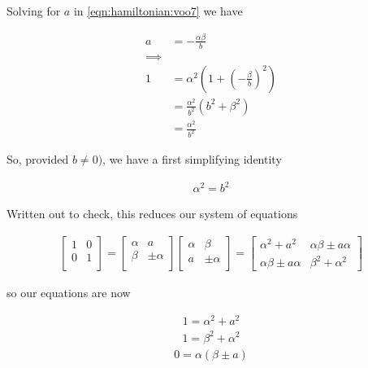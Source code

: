 Solving for $a$ in \ref{eqn:hamiltonian:voo7} we have

\begin{align*}
a &= -\frac{\alpha \beta}{b} \\
\implies \\
1 
&= \alpha^2 \left( 1 + \left(-\frac{\beta}{b} \right)^2 \right) \\
&= \frac{\alpha^2}{b^2} \left( b^2 + \beta^2 \right) \\
&= \frac{\alpha^2}{b^2} 
\end{align*}

So, provided $b \ne 0)$, we have a first simplifying identity

\begin{align}\label{eqn:hamiltonian:voo8}
\alpha^2 = b^2
\end{align}

Written out to check, this reduces our system of equations

\begin{align}\label{eqn:hamiltonian:voo9}
\begin{bmatrix}
1 & 0 \\
0 & 1 \\
\end{bmatrix}
=
\begin{bmatrix}
\alpha & a     \\
\beta  & \pm \alpha \\
\end{bmatrix}
\begin{bmatrix}
\alpha & \beta \\
a      & \pm \alpha \\
\end{bmatrix}
= 
\begin{bmatrix}
\alpha^2 + a^2 & \alpha \beta \pm a \alpha \\
\alpha \beta \pm a \alpha & \beta^2 + \alpha^2
\end{bmatrix}
\end{align}

so our equations are now

\begin{align}\label{eqn:hamiltonian:voo10}
1 = \alpha^2 + a^2 
\end{align}
\begin{align}\label{eqn:hamiltonian:voo11}
1 = \beta^2 + \alpha^2
\end{align}
\begin{align}\label{eqn:hamiltonian:voo12}
0 = \alpha (\beta \pm a )
\end{align}

